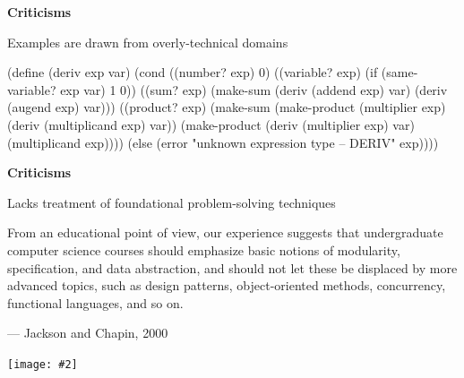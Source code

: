 \documentclass[UKenglish,usenames,dvipsnames,svgnames,table,aspectratio=169,mathserif]{beamer}
\newcommand{\nl}{\vspace{\baselineskip}}
\newcommand{\imageslide}[2][1]{{
\begin{frame}\begin{center}
\texttt{[image: \#2]}
\end{center}\end{frame}
}}
\begin{document}
\begin{frame}[fragile]

\begin{center}
{\bf Criticisms}
\end{center}
\begin{center}
Examples are drawn from overly-technical domains

\nl

{\scriptsize
\begin{schemecode}
(define (deriv exp var)
  (cond ((number? exp) 0)
        ((variable? exp)
         (if (same-variable? exp var) 1 0))
        ((sum? exp)
         (make-sum (deriv (addend exp) var)
                   (deriv (augend exp) var)))
        ((product? exp)
         (make-sum
           (make-product (multiplier exp)
                         (deriv (multiplicand exp) var))
           (make-product (deriv (multiplier exp) var)
                         (multiplicand exp))))
        (else
         (error "unknown expression type -- DERIV" exp))))
\end{schemecode}
}
\end{center}
\end{frame}


\begin{frame}

\begin{center}
{\bf Criticisms}
\end{center}
\begin{center}
Lacks treatment of foundational problem-solving techniques
\end{center}

\begin{block}{}
From an educational point of view, our experience suggests that undergraduate computer
science courses should emphasize basic notions of modularity, specification, and
data abstraction, and should not let these be displaced by more advanced topics,
such as design patterns, object-oriented methods, concurrency, functional languages,
and so on.

\nl

--- Jackson and Chapin, 2000
\end{block}
\end{frame}

\imageslide[0.5]{htdp-cover.png}



\end{document}
